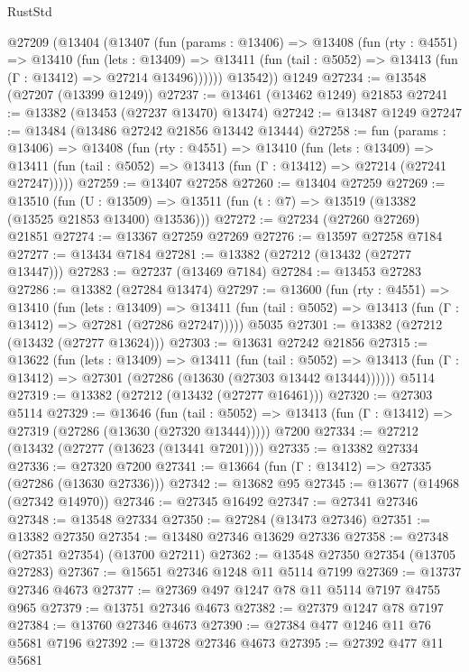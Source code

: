 \begin{lexlean}{RustStd}
\begin{coremodule}
    @27209
      (@13404
        (@13407
          (fun (params : @13406) =>
          @13408
            (fun (rty : @4551) =>
            @13410
              (fun (lets : @13409) =>
              @13411 (fun (tail : @5052) => @13413 (fun (Γ : @13412) => @27214 @13496))))))
        @13542))
    @1249
@27234 := @13548 (@27207 (@13399 @1249))
@27237 := @13461 (@13462 @1249) @21853
@27241 := @13382 (@13453 (@27237 @13470) @13474)
@27242 := @13487 @1249
@27247 := @13484 (@13486 @27242 @21856 @13442 @13444)
@27258 := fun (params : @13406) =>
  @13408
    (fun (rty : @4551) =>
    @13410
      (fun (lets : @13409) =>
      @13411 (fun (tail : @5052) => @13413 (fun (Γ : @13412) => @27214 (@27241 @27247)))))
@27259 := @13407 @27258
@27260 := @13404 @27259
@27269 := @13510
    (fun (U : @13509) => @13511 (fun (t : @7) => @13519 (@13382 (@13525 @21853 @13400) @13536)))
@27272 := @27234 (@27260 @27269) @21851
@27274 := @13367 @27259 @27269
@27276 := @13597 @27258 @7184
@27277 := @13434 @7184
@27281 := @13382 (@27212 (@13432 (@27277 @13447)))
@27283 := @27237 (@13469 @7184)
@27284 := @13453 @27283
@27286 := @13382 (@27284 @13474)
@27297 := @13600
    (fun (rty : @4551) =>
    @13410
      (fun (lets : @13409) =>
      @13411 (fun (tail : @5052) => @13413 (fun (Γ : @13412) => @27281 (@27286 @27247)))))
    @5035
@27301 := @13382 (@27212 (@13432 (@27277 @13624)))
@27303 := @13631 @27242 @21856
@27315 := @13622
    (fun (lets : @13409) =>
    @13411
      (fun (tail : @5052) =>
      @13413 (fun (Γ : @13412) => @27301 (@27286 (@13630 (@27303 @13442 @13444))))))
    @5114
@27319 := @13382 (@27212 (@13432 (@27277 @16461)))
@27320 := @27303 @5114
@27329 := @13646
    (fun (tail : @5052) => @13413 (fun (Γ : @13412) => @27319 (@27286 (@13630 (@27320 @13444)))))
    @7200
@27334 := @27212 (@13432 (@27277 (@13623 (@13441 @7201))))
@27335 := @13382 @27334
@27336 := @27320 @7200
@27341 := @13664 (fun (Γ : @13412) => @27335 (@27286 (@13630 @27336)))
@27342 := @13682 @95
@27345 := @13677 (@14968 (@27342 @14970))
@27346 := @27345 @16492
@27347 := @27341 @27346
@27348 := @13548 @27334
@27350 := @27284 (@13473 @27346)
@27351 := @13382 @27350
@27354 := @13480 @27346 @13629 @27336
@27358 := @27348 (@27351 @27354) (@13700 @27211)
@27362 := @13548 @27350 @27354 (@13705 @27283)
@27367 := @15651 @27346 @1248 @11 @5114 @7199
@27369 := @13737 @27346 @4673
@27377 := @27369 @497 @1247 @78 @11 @5114 @7197 @4755 @965
@27379 := @13751 @27346 @4673
@27382 := @27379 @1247 @78 @7197
@27384 := @13760 @27346 @4673
@27390 := @27384 @477 @1246 @11 @76 @5681 @7196
@27392 := @13728 @27346 @4673
@27395 := @27392 @477 @11 @5681

\end{coremodule}
\end{lexlean}
